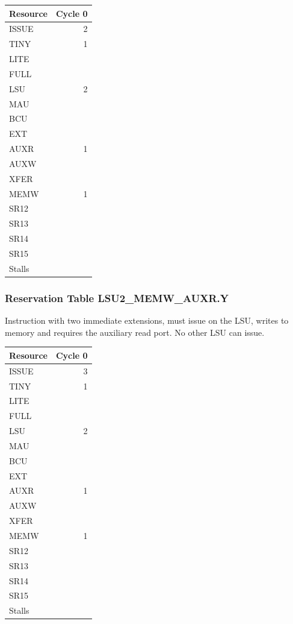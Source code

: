 \begin{tabular}{|l|r|} \hline
Resource	& Cycle 0 \\ \hline
\textsf{ISSUE}	& 2	\\
\textsf{TINY}	& 1	\\
\textsf{LITE}	& 	\\
\textsf{FULL}	& 	\\
\textsf{LSU}	& 2	\\
\textsf{MAU}	& 	\\
\textsf{BCU}	& 	\\
\textsf{EXT}	& 	\\
\textsf{AUXR}	& 1	\\
\textsf{AUXW}	& 	\\
\textsf{XFER}	& 	\\
\textsf{MEMW}	& 1	\\
\textsf{SR12}	& 	\\
\textsf{SR13}	& 	\\
\textsf{SR14}	& 	\\
\textsf{SR15}	& 	\\
\hline Stalls	& 	\\
\hline \end{tabular}

\subsubsection{Reservation Table LSU2\_MEMW\_AUXR.Y} \label{sec:reservation-LSU2-MEMW-AUXR.Y}

Instruction with two immediate extensions, must issue on the LSU, writes to memory and requires the auxiliary read port. No other LSU can issue.
\medskip

\begin{tabular}{|l|r|} \hline
Resource	& Cycle 0 \\ \hline
\textsf{ISSUE}	& 3	\\
\textsf{TINY}	& 1	\\
\textsf{LITE}	& 	\\
\textsf{FULL}	& 	\\
\textsf{LSU}	& 2	\\
\textsf{MAU}	& 	\\
\textsf{BCU}	& 	\\
\textsf{EXT}	& 	\\
\textsf{AUXR}	& 1	\\
\textsf{AUXW}	& 	\\
\textsf{XFER}	& 	\\
\textsf{MEMW}	& 1	\\
\textsf{SR12}	& 	\\
\textsf{SR13}	& 	\\
\textsf{SR14}	& 	\\
\textsf{SR15}	& 	\\
\hline Stalls	& 	\\
\hline \end{tabular}

